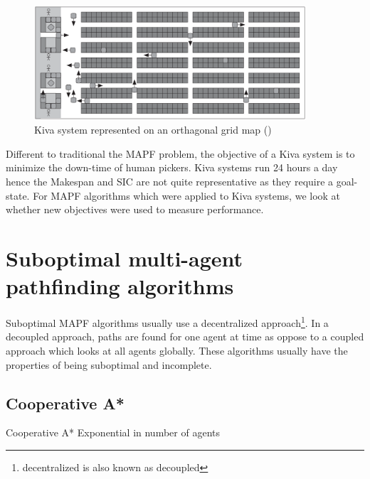 \documentclass[a4paper,11pt]{article}
\begin{document}
\begin{figure}[h]
	\centering
	\includegraphics[width=0.9\textwidth]{graphics/kivasystemlayout}
	\caption{Kiva system represented on an orthagonal grid map (\cite{wurman2008coordinating})}
	\label{fig:kivawarehouse}
\end{figure}

Different to traditional the MAPF problem, the objective of a Kiva system is to minimize the down-time of human pickers. Kiva systems run 24 hours a day hence the Makespan and SIC are not quite representative as they require a goal-state. For MAPF algorithms which were applied to Kiva systems, we look at whether new objectives were used to measure performance.

\section{Suboptimal multi-agent pathfinding algorithms} \label{sec:suboptimal}
Suboptimal MAPF algorithms usually use a decentralized approach\footnote{decentralized is also known as decoupled}. In a decoupled approach, paths are found for one agent at time as oppose to a coupled approach which looks at all agents globally. These algorithms usually have the properties of being suboptimal and incomplete.


\subsection{Cooperative A*}
Cooperative A*
Exponential in number of agents

\cite{holte1995hierarchical}
\end{document}
